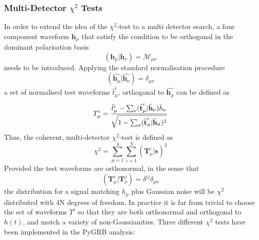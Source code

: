 \documentclass[binding=0.6cm, LaM]{sapthesis}
\begin{document}
\subsubsection{Multi-Detector $\chi^2$ Tests}
\label{subsubsec:multidec_chi_test}	
	In order to extend the idea of the $\chi^2$-test to a multi detector search,
	a four component waveform $\textbf{h}_{\mu}$ that satisfy the condition to 	
	be orthogonal in the dominant polarisation basis 
        \begin{equation}
          (\textbf{h}_{\mu}|\textbf{h}_{\nu}) = \mathcal{M}_{\mu \nu}
        \end{equation}
	needs to be introduced.
	Applying the standard normalisation procedure
        \begin{equation}
          (\hat{\textbf{h}_{\mu}}|\hat{\textbf{h}_{\nu}}) = \delta_{\mu \nu}
        \end{equation}
	a set of normalised test waveforms $\hat{t}^i_{\mu}$, orthogonal to $\hat{\textbf{h}_{\mu}}$ can be defined as
        \begin{equation}
          T^i_{\mu} = {{\hat{t}^i_{\mu} - \sum_{\nu}(\hat{\textbf{t}}^i_{\mu}|\hat{\textbf{h}}_{\nu})\hat{h}_{\nu}} \over {\sqrt{1-\sum_{\sigma}(\hat{\textbf{t}}^i_{\sigma}|\hat{\textbf{h}}_{\sigma})^2}}}
        \end{equation}
	Thus, the coherent, multi-detector $\chi^2$-test is defined as 
        \begin{equation}
          \chi^2= \sum^4_{\mu=1} \sum^N_{i=1} (\textbf{T}^i_{\mu}|\textbf{s})^2
        \end{equation}
	Provided the test waveforms are orthonormal, in the 
        sense that 
        \begin{equation}
          (\textbf{T}^i_{\mu}| \textbf{T}^j_{\nu})= \delta^{ij} \delta_{\mu \nu}
        \end{equation}
	the distribution for a signal matching $h_{\mu}$ plus Gaussian noise will be $\chi^2$ distributed with 4N degrees of freedom. 
	In practice it is far from trivial to choose the set of waveforms $T^i$ so that 
	they are both orthonormal and orthogonal to $h(t)$, and match a variety of non-Gaussianities. 
	Three different $\chi^2$ tests have been implemented in the {\ttfamily PyGRB} analysis: 
\end{document}
